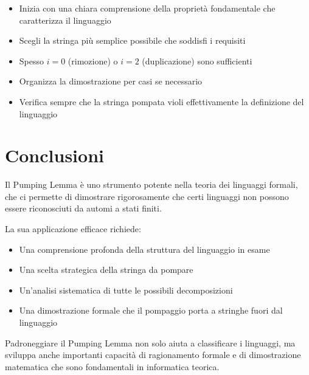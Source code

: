 \documentclass[12pt,a4paper]{article}
\begin{document}
\begin{suggerimento}
\begin{itemize}
    \item Inizia con una chiara comprensione della proprietà fondamentale che caratterizza il linguaggio
    \item Scegli la stringa più semplice possibile che soddisfi i requisiti
    \item Spesso $i = 0$ (rimozione) o $i = 2$ (duplicazione) sono sufficienti
    \item Organizza la dimostrazione per casi se necessario
    \item Verifica sempre che la stringa pompata violi effettivamente la definizione del linguaggio
\end{itemize}
\end{suggerimento}

\section{Conclusioni}

Il Pumping Lemma è uno strumento potente nella teoria dei linguaggi formali, che ci permette di dimostrare rigorosamente che certi linguaggi non possono essere riconosciuti da automi a stati finiti.

La sua applicazione efficace richiede:
\begin{itemize}
    \item Una comprensione profonda della struttura del linguaggio in esame
    \item Una scelta strategica della stringa da pompare
    \item Un'analisi sistematica di tutte le possibili decomposizioni
    \item Una dimostrazione formale che il pompaggio porta a stringhe fuori dal linguaggio
\end{itemize}

\begin{concettochiave}
Padroneggiare il Pumping Lemma non solo aiuta a classificare i linguaggi, ma sviluppa anche importanti capacità di ragionamento formale e di dimostrazione matematica che sono fondamentali in informatica teorica.
\end{concettochiave}
\end{document}
